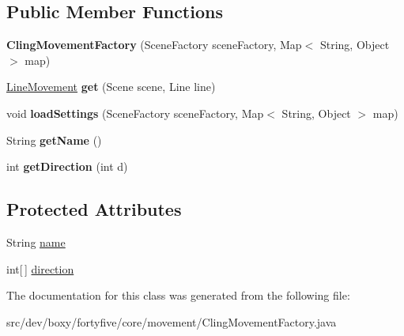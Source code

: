 \subsection*{Public Member Functions}
\begin{DoxyCompactItemize}
\item 
\hypertarget{classdev_1_1boxy_1_1fortyfive_1_1core_1_1movement_1_1_cling_movement_factory_a6c4e1534d330fd859a1298080187dbde}{
{\bfseries ClingMovementFactory} (SceneFactory sceneFactory, Map$<$ String, Object $>$ map)}
\label{db/d15/classdev_1_1boxy_1_1fortyfive_1_1core_1_1movement_1_1_cling_movement_factory_a6c4e1534d330fd859a1298080187dbde}

\item 
\hypertarget{classdev_1_1boxy_1_1fortyfive_1_1core_1_1movement_1_1_cling_movement_factory_ab9a498c14872b1c219dd59b43654cd5b}{
\hyperlink{classdev_1_1boxy_1_1fortyfive_1_1core_1_1movement_1_1_line_movement}{LineMovement} {\bfseries get} (Scene scene, Line line)}
\label{db/d15/classdev_1_1boxy_1_1fortyfive_1_1core_1_1movement_1_1_cling_movement_factory_ab9a498c14872b1c219dd59b43654cd5b}

\item 
\hypertarget{classdev_1_1boxy_1_1fortyfive_1_1core_1_1movement_1_1_cling_movement_factory_acb95f20c57c861620853ad1462021061}{
void {\bfseries loadSettings} (SceneFactory sceneFactory, Map$<$ String, Object $>$ map)}
\label{db/d15/classdev_1_1boxy_1_1fortyfive_1_1core_1_1movement_1_1_cling_movement_factory_acb95f20c57c861620853ad1462021061}

\item 
\hypertarget{classdev_1_1boxy_1_1fortyfive_1_1core_1_1movement_1_1_cling_movement_factory_a50f10fd2af3a14e220afb96295d61348}{
String {\bfseries getName} ()}
\label{db/d15/classdev_1_1boxy_1_1fortyfive_1_1core_1_1movement_1_1_cling_movement_factory_a50f10fd2af3a14e220afb96295d61348}

\item 
\hypertarget{classdev_1_1boxy_1_1fortyfive_1_1core_1_1movement_1_1_cling_movement_factory_a3a093485abe697f5624e33635bbffffa}{
int {\bfseries getDirection} (int d)}
\label{db/d15/classdev_1_1boxy_1_1fortyfive_1_1core_1_1movement_1_1_cling_movement_factory_a3a093485abe697f5624e33635bbffffa}

\end{DoxyCompactItemize}
\subsection*{Protected Attributes}
\begin{DoxyCompactItemize}
\item 
String \hyperlink{group___cling_movement_gaa579f2e009783fee52786dbd2d9bb066}{name}
\item 
int\mbox{[}$\,$\mbox{]} \hyperlink{group___cling_movement_ga7b80960ec266700a327ef11aec88b852}{direction}
\end{DoxyCompactItemize}


The documentation for this class was generated from the following file:\begin{DoxyCompactItemize}
\item 
src/dev/boxy/fortyfive/core/movement/ClingMovementFactory.java\end{DoxyCompactItemize}
